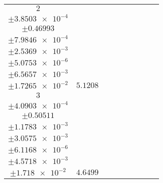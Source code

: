\documentclass[8pt]{article}
\begin{document}
\begin{longtable}[l]{c c c c c c c c c}
$\num{2}$ & \begin{tabular}[c]{@{}c@{}}$\num{6.3585e-2}$ \\ $\pm\num{3.8503e-4}$\end{tabular} & \begin{tabular}[c]{@{}c@{}}$\num{0.15662}$ \\ $\pm\num{0.46993}$\end{tabular} & \begin{tabular}[c]{@{}c@{}}$\num{-2.4349}$ \\ $\pm\num{7.9846e-4}$\end{tabular} & \begin{tabular}[c]{@{}c@{}}$\num{942.21}$ \\ $\pm\num{2.5369e-3}$\end{tabular} & \begin{tabular}[c]{@{}c@{}}$\num{1.8849}$ \\ $\pm\num{5.0753e-6}$\end{tabular} & \begin{tabular}[c]{@{}c@{}}$\num{1.1948}$ \\ $\pm\num{6.5657e-3}$\end{tabular} & \begin{tabular}[c]{@{}c@{}}$\num{4.0622}$ \\ $\pm\num{1.7265e-2}$\end{tabular} & $\num{5.1208}$\\
$\num{3}$ & \begin{tabular}[c]{@{}c@{}}$\num{5.5414e-2}$ \\ $\pm\num{4.0903e-4}$\end{tabular} & \begin{tabular}[c]{@{}c@{}}$\num{8.8805e-2}$ \\ $\pm\num{0.50511}$\end{tabular} & \begin{tabular}[c]{@{}c@{}}$\num{-2.1362}$ \\ $\pm\num{1.1783e-3}$\end{tabular} & \begin{tabular}[c]{@{}c@{}}$\num{942.61}$ \\ $\pm\num{3.0575e-3}$\end{tabular} & \begin{tabular}[c]{@{}c@{}}$\num{1.8858}$ \\ $\pm\num{6.1168e-6}$\end{tabular} & \begin{tabular}[c]{@{}c@{}}$\num{1.0997}$ \\ $\pm\num{4.5718e-3}$\end{tabular} & \begin{tabular}[c]{@{}c@{}}$\num{4.0314}$ \\ $\pm\num{1.718e-2}$\end{tabular} & $\num{4.6499}$\\

\end{longtable}
\end{document}
